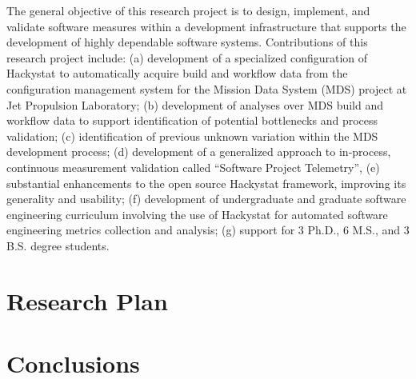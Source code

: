 \medskip

The general objective of this research project is to design, implement, and
validate software measures within a development infrastructure that
supports the development of highly dependable software systems.
Contributions of this research project include: (a) development of a
specialized configuration of Hackystat to automatically acquire build and
workflow data from the configuration management system for the Mission Data
System (MDS) project at Jet Propulsion Laboratory; (b) development of
analyses over MDS build and workflow data to support identification of
potential bottlenecks and process validation; (c) identification of
previous unknown variation within the MDS development process; (d)
development of a generalized approach to in-process, continuous measurement
validation called ``Software Project Telemetry'', (e) substantial
enhancements to the open source Hackystat framework, improving its
generality and usability; (f) development of undergraduate and graduate
software engineering curriculum involving the use of Hackystat for
automated software engineering metrics collection and analysis; (g) support
for 3 Ph.D., 6 M.S., and 3 B.S. degree students. 



\section{Research Plan}



\section{Conclusions}
